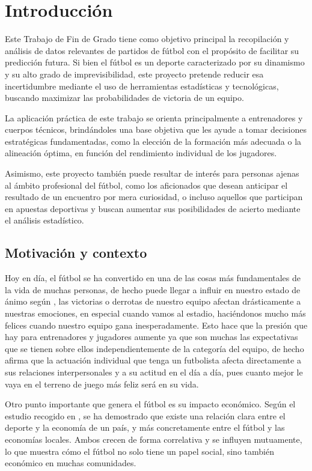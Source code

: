 \chapter{Introducción}

Este Trabajo de Fin de Grado tiene como objetivo principal la recopilación y análisis de datos relevantes de partidos de fútbol con el propósito de facilitar su predicción futura. Si bien el fútbol es un deporte caracterizado por su dinamismo y su alto grado de imprevisibilidad, este proyecto pretende reducir esa incertidumbre mediante el uso de herramientas estadísticas y tecnológicas, buscando maximizar las probabilidades de victoria de un equipo.

La aplicación práctica de este trabajo se orienta principalmente a entrenadores y cuerpos técnicos, brindándoles una base objetiva que les ayude a tomar decisiones estratégicas fundamentadas, como la elección de la formación más adecuada o la alineación óptima, en función del rendimiento individual de los jugadores.

Asimismo, este proyecto también puede resultar de interés para personas ajenas al ámbito profesional del fútbol, como los aficionados que desean anticipar el resultado de un encuentro por mera curiosidad, o incluso aquellos que participan en apuestas deportivas y buscan aumentar sus posibilidades de acierto mediante el análisis estadístico.

\section{Motivación y contexto}

Hoy en día, el fútbol se ha convertido en una de las cosas más fundamentales de la vida de muchas personas, de hecho puede llegar a influir en nuestro estado de ánimo según \cite{impact-football-mood}, las victorias o derrotas de nuestro equipo afectan drásticamente a nuestras emociones, en especial cuando vamos al estadio, haciéndonos mucho más felices cuando nuestro equipo gana inesperadamente. Esto hace que la presión que hay para entrenadores y jugadores aumente ya que son muchas las expectativas que se tienen sobre ellos independientemente de la categoría del equipo, de hecho \cite{act-footballist} afirma que la actuación individual que tenga un futbolista afecta directamente a sus relaciones interpersonales y a su actitud en el día a día, pues cuanto mejor le vaya en el terreno de juego más feliz será en su vida.

Otro punto importante que genera el fútbol es su impacto económico. Según el estudio recogido en \cite{economy-football}, se ha demostrado que existe una relación clara entre el deporte y la economía de un país, y más concretamente entre el fútbol y las economías locales. Ambos crecen de forma correlativa y se influyen mutuamente, lo que muestra cómo el fútbol no solo tiene un papel social, sino también económico en muchas comunidades.

